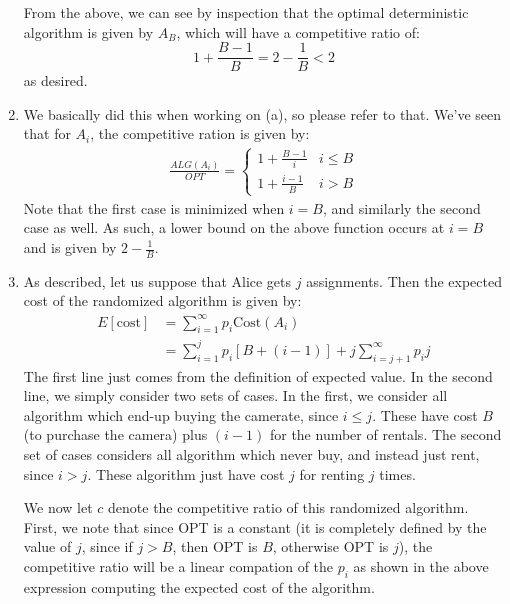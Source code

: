 \documentclass[12pt]{exam}
\begin{document}
\begin{questions}
\begin{solution}
\begin{enumerate}[label=(\alph*)]
    From the above, we can see by inspection that the optimal deterministic algorithm is given by $A_B$, which will have a competitive ratio of:
    \[
      1 + \frac{B - 1}{B} = 2 - \frac{1}{B} < 2
    \]
    as desired.

  \item
    We basically did this when working on (a), so please refer to that. We've seen that for $A_i$, the competitive ration is given by:
    \begin{align*}
      \frac{ALG(A_i)}{OPT} = \begin{cases}
        1 + \frac{B - 1}{i} & i \leq B \\
        1 + \frac{i - 1}{B} & i > B
      \end{cases}
    \end{align*}
    Note that the first case is minimized when $i = B$, and similarly the second case as well. As such, a lower bound on the above function occurs at $i = B$ and is given by $2 - \frac{1}{B}$.

    \item
      As described, let us suppose that Alice gets $j$ assignments. Then the expected cost of the randomized algorithm is given by:
      \begin{align*}
        E[\text{cost}] &= \sum_{i=1}^{\infty} p_i \text{Cost}(A_i) \\
        &= \sum_{i=1}^{j} p_i[B + (i-1)] + j \sum_{i=j+1}^\infty p_i j
      \end{align*}
      The first line just comes from the definition of expected value. In the second line, we simply consider two sets of cases. In the first, we consider all algorithm which end-up buying the camerate, since $i \leq j$. These have cost $B$ (to purchase the camera) plus $(i-1)$ for the number of rentals. The second set of cases considers all algorithm which never buy, and instead just rent, since $i > j$. These algorithm just have cost $j$ for renting $j$ times.

      We now let $c$ denote the competitive ratio of this randomized algorithm. First, we note that since OPT is a constant (it is completely defined by the value of $j$, since if $j > B$, then OPT is $B$, otherwise OPT is $j$), the competitive ratio will be a linear compation of the $p_i$ as shown in the above expression computing the expected cost of the algorithm.


\end{enumerate}
\end{solution}
\end{questions}
\end{document}
